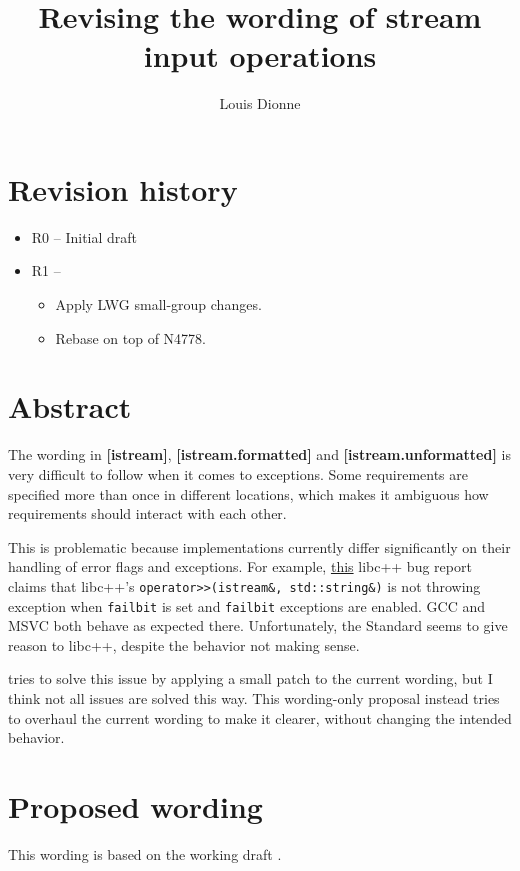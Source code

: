 \documentclass{wg21}
\title{Revising the wording of stream input operations}
\author{Louis Dionne}{ldionne@apple.com}
\newcommand{\cc}[1]{\texttt{#1}}
\begin{document}
\maketitle

\section{Revision history}
\begin{itemize}
  \item R0 -- Initial draft
  \item R1 -- \begin{itemize}
              \item Apply LWG small-group changes.
              \item Rebase on top of N4778.
              \end{itemize}
\end{itemize}

\section{Abstract}
The wording in \textbf{[istream]}, \textbf{[istream.formatted]} and
\textbf{[istream.unformatted]} is very difficult to follow when it comes
to exceptions. Some requirements are specified more than once in different
locations, which makes it ambiguous how requirements should interact with
each other.

This is problematic because implementations currently differ significantly
on their handling of error flags and exceptions. For example,
\href{https://bugs.llvm.org/show_bug.cgi?id=21586}{this} libc++ bug
report claims that libc++'s \break \cc{operator>>(istream&, std::string&)} is
not throwing exception when \cc{failbit} is set and \cc{failbit} exceptions
are enabled. GCC and MSVC both behave as expected there. Unfortunately, the
Standard seems to give reason to libc++, despite the behavior not making sense.

\cite{LWG2349} tries to solve this issue by applying a small patch to the current
wording, but I think not all issues are solved this way. This wording-only
proposal instead tries to overhaul the current wording to make it clearer,
without changing the intended behavior.


\section{Proposed wording}
This wording is based on the working draft \cite{N4778}.
\end{document}
